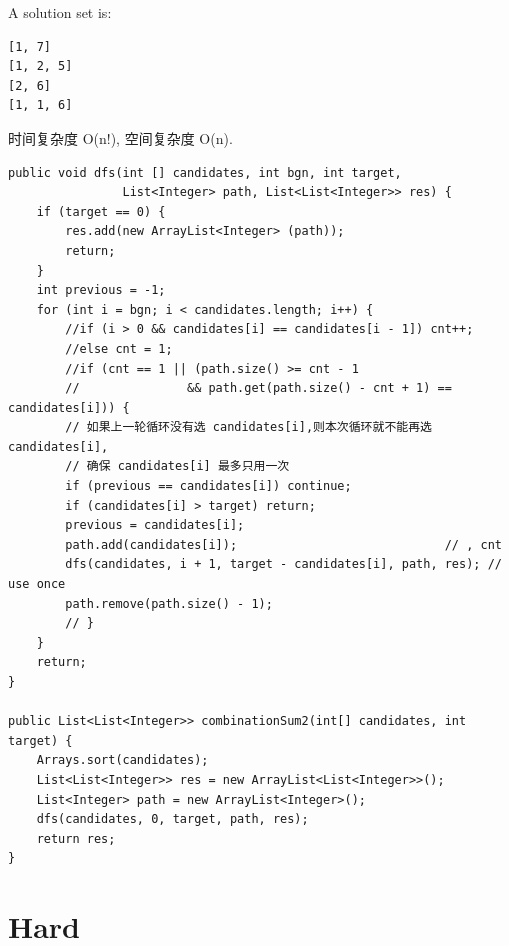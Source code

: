 \documentclass[12pt]{book}
\begin{document}
A solution set is: 
\lstset{language=java,label= ,caption= ,numbers=none}
\begin{lstlisting}
[1, 7] 
[1, 2, 5] 
[2, 6] 
[1, 1, 6]
\end{lstlisting}

时间复杂度 O(n!), 空间复杂度 O(n). 

\lstset{language=java,label= ,caption= ,numbers=none}
\begin{lstlisting}
public void dfs(int [] candidates, int bgn, int target,
                List<Integer> path, List<List<Integer>> res) {
    if (target == 0) {
        res.add(new ArrayList<Integer> (path));
        return;
    }
    int previous = -1;
    for (int i = bgn; i < candidates.length; i++) {
        //if (i > 0 && candidates[i] == candidates[i - 1]) cnt++;
        //else cnt = 1;
        //if (cnt == 1 || (path.size() >= cnt - 1
        //               && path.get(path.size() - cnt + 1) == candidates[i])) {
        // 如果上一轮循环没有选 candidates[i],则本次循环就不能再选 candidates[i],
        // 确保 candidates[i] 最多只用一次
        if (previous == candidates[i]) continue;
        if (candidates[i] > target) return;
        previous = candidates[i];
        path.add(candidates[i]);                             // , cnt
        dfs(candidates, i + 1, target - candidates[i], path, res); // use once
        path.remove(path.size() - 1);
        // }
    }
    return;
}
        
public List<List<Integer>> combinationSum2(int[] candidates, int target) {
    Arrays.sort(candidates); 
    List<List<Integer>> res = new ArrayList<List<Integer>>();
    List<Integer> path = new ArrayList<Integer>();
    dfs(candidates, 0, target, path, res);
    return res;
}
\end{lstlisting}

\section{Hard}
\label{sec-11-2}
\end{document}
